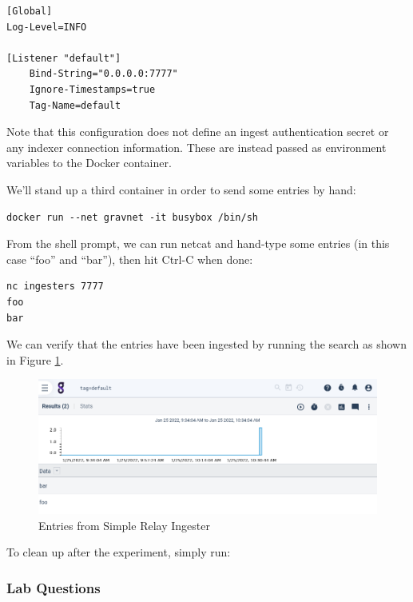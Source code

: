 \begin{Verbatim}[breaklines=true]
[Global]
Log-Level=INFO

[Listener "default"]
    Bind-String="0.0.0.0:7777"
    Ignore-Timestamps=true
    Tag-Name=default
\end{Verbatim}

Note that this configuration does not define an ingest authentication
secret or any indexer connection information. These are instead passed
as environment variables to the Docker container.

We'll stand up a third container in order to send some entries by
hand:

\begin{Verbatim}[breaklines=true]
docker run --net gravnet -it busybox /bin/sh
\end{Verbatim}

{From the shell prompt, we can run netcat and hand-type some entries (in
this case ``foo'' and ``bar''), then hit Ctrl-C when done:}

\begin{Verbatim}[breaklines=true]
nc ingesters 7777
foo
bar
\end{Verbatim}

We can verify that the entries have been ingested by running the search
 as shown in Figure \ref{fig:simple-relay-lab}.

\begin{figure}
	\includegraphics{images/igst-syslog-lab.png}
	\caption{Entries from Simple Relay Ingester}
	\label{fig:simple-relay-lab}
\end{figure}

To clean up after the experiment, simply run:


\subsubsection{Lab Questions}

